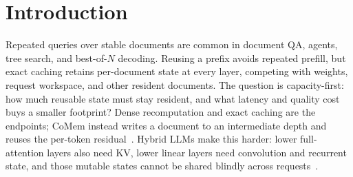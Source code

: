 \documentclass{article}
\newcommand{\gib}{\,\mathrm{GiB}}
\begin{document}
\begin{abstract}
than copying it per request lowers the
post-priming allocator delta from $4.901$ to $2.229\gib$ final ($54.5\%$) and
$4.920$ to $2.843\gib$ peak ($42.2\%$) --- but that full-copy arm is a
controlled ownership factor, not an optimized baseline, and against this paper's
own paged-prefix baseline the audited fork ties at $2.229/2.843\gib$ and is
worse on generation increment ($1.950$ versus $0.019\gib$), so it buys auditable
request-local state, not fewer allocator bytes.  The audit exposes a historical
alias that output and terminal-state equality miss but a persistent-base content
invariant also catches, so its increment is transition-time localization, not
exclusive detection.  We claim no lower total process memory, measured recall,
edge-device performance or broad quality preservation.
\end{abstract}

\section{Introduction}
\label{sec:intro}

Repeated queries over stable documents are common in document QA, agents, tree
search, and best-of-$N$ decoding.  Reusing a prefix avoids repeated prefill, but
exact caching retains per-document state at every layer, competing with weights,
request workspace, and other resident documents.  The question is
capacity-first: how much reusable state must stay resident, and what latency and
quality cost buys a smaller footprint?  Dense recomputation and exact caching are
the endpoints; CoMem instead writes a document to an intermediate depth and
reuses the per-token residual~\citep{liu2026comem,liu2026understanding}.  Hybrid
LLMs make this harder: lower full-attention layers also need KV, lower linear
layers need convolution and recurrent state, and those mutable states cannot be
shared blindly across requests~\citep{yang2025gateddeltanet,lieber2025jamba}.
\end{document}
